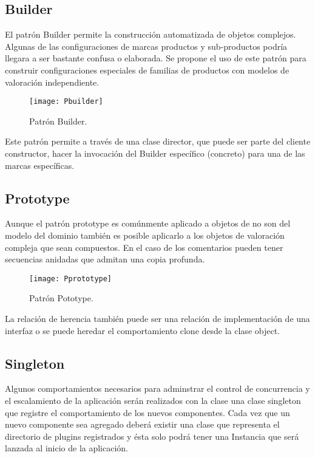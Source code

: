 \subsection{Builder}

El patrón Builder permite la construcción automatizada de objetos complejos. Algunas de las configuraciones de marcas productos y sub-productos podría llegara a ser bastante confusa o elaborada. Se propone el uso de este patrón para construir configuraciones especiales de familias de productos con modelos de valoración independiente.  

\begin{figure}[H]
\centering
\texttt{[image: Pbuilder]}
\caption{Patrón Builder.}
\end{figure}

Este patrón permite a través de una clase director, que puede ser parte del cliente constructor, hacer la invocación del Builder específico (concreto) para una de las marcas específicas.   

\subsection{Prototype}

Aunque el patrón prototype es comúnmente aplicado a objetos de no son del modelo del dominio también es posible aplicarlo a los objetos de valoración compleja que sean compuestos. En el caso de los comentarios pueden tener secuencias anidadas que admitan una copia profunda.

\begin{figure}[H]
\centering
\texttt{[image: Pprototype]}
\caption{Patrón Pototype.}
\end{figure}

La relación de herencia también puede ser una relación de implementación de una interfaz o se puede heredar el comportamiento clone desde la clase object. 

\subsection{Singleton}

Algunos comportamientos necesarios para adminstrar el control de concurrencia y el escalamiento de la aplicación serán realizados con la clase una clase singleton que registre el comportamiento de los nuevos componentes. Cada vez que un nuevo componente sea agregado deberá existir una clase que representa el directorio de plugins registrados y ésta solo podrá tener una Instancia que será lanzada al inicio de la aplicación.

